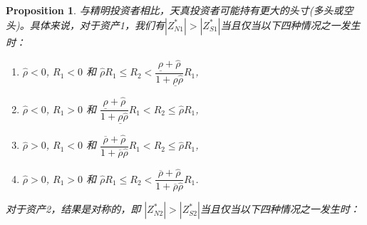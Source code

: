\documentclass[10.0pt]{article}
\newtheorem{prop}{Proposition}
\begin{document}
\begin{prop}
与精明投资者相比，天真投资者可能持有更大的头寸(多头或空头)。具体来说，对于资产1，我们有$ |Z_{N1}^*| > |Z_{S1}^*|$当且仅当以下四种情况之一发生时：
\begin{enumerate}
\item [(1).] $ \hat{\rho} < 0 $, $ R_1 < 0 $ 和 $ \hat{\rho} R_1 \leqslant R_2 < \dfrac{\underline{\rho} + {\hat \rho}}{1 + \underline{\rho} {\hat \rho}} R_1 $,
\item [(2).] $ \hat{\rho} < 0 $, $ R_1 > 0 $ 和 $ \dfrac{\underline{\rho} + {\hat \rho}}{1 + \underline{\rho} {\hat \rho}} R_1 < R_2 \leqslant \hat{\rho} R_1 $, 
\item [(3).] $ \hat{\rho} > 0 $, $ R_1 < 0 $ 和 $ \dfrac{\overline{\rho} + {\hat \rho}}{1 + \overline{\rho} {\hat \rho}} R_1 < R_2 \leqslant \hat{\rho} R_1 $,
\item [(4).] $ \hat{\rho} > 0 $, $ R_1 > 0 $ 和 $ \hat{\rho} R_1 \leqslant R_2 < \dfrac{\overline{\rho} + {\hat \rho}}{1 + \overline{\rho} {\hat \rho}} R_1 $.
\end{enumerate}
对于资产2，结果是对称的，即 $|Z_{N2}^{*}| > |Z_{S2}^{*}|$当且仅当以下四种情况之一发生时：

\end{prop}
\end{document}
